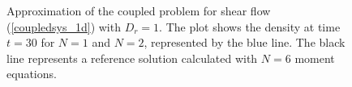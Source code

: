 \begin{frame}
\begin{figure}
\begin{minipage}{0.46\textwidth}
		\end{minipage}
		\caption{Approximation of the coupled problem for shear flow (\ref{coupledsys_1d}) with $D_r =1$. The plot shows the density at time $t=30$ for $N = 1$ and $N = 2$, represented by the blue line. The black line represents a reference solution calculated with $N = 6$ moment equations.}
		\label{ClusterFormation_Dr=1}
	\end{figure}
\end{frame}
